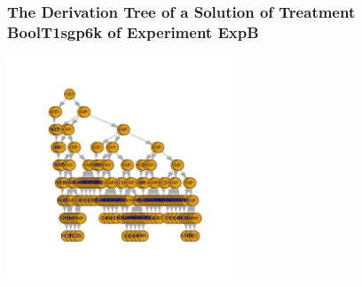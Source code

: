  \begin{frame}
 \frametitle{ The Derivation Tree of a Solution of Treatment BoolT1sgp6k of Experiment ExpB }
 \begin{center}
\includegraphics[width=0.5\textwidth, angle=0]
{ExpBDerivationTreeFigure009.pdf}
 \end{center}
 \label{report/ExpBDerivationTreeFigure009.pdf}  
 \end{frame}

